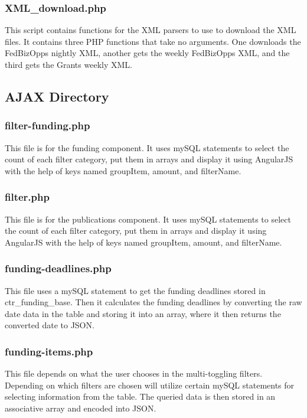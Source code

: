 \documentclass[onecolumn]{IEEEtran}
\begin{document}
\subsubsection{XML\_download.php}
This script contains functions for the XML parsers to use to download the XML files. It contains three PHP functions that take no arguments. One downloads the FedBizOpps nightly XML, another gets the weekly FedBizOpps XML, and the third gets the Grants weekly XML. 
 
\subsection{AJAX Directory}
\subsubsection{filter-funding.php}
This file is for the funding component. It uses mySQL statements to select the count of each filter category, put them in arrays and display it using AngularJS with the help of keys named groupItem, amount, and filterName. 

\subsubsection{filter.php}
This file is for the publications component. It uses mySQL statements to select the count of each filter category, put them in arrays and display it using AngularJS with the help of keys named groupItem, amount, and filterName. 

\subsubsection{funding-deadlines.php}
This file uses a mySQL statement to get the funding deadlines stored in ctr\_funding\_base. Then it calculates the funding deadlines by converting the raw date data in the table and storing it into an array, where it then returns the converted date to JSON. 

\subsubsection{funding-items.php}
This file depends on what the user chooses in the multi-toggling filters. Depending on which filters are chosen will utilize certain mySQL statements for selecting information from the table. The queried data is then stored in an associative array and encoded into JSON.  
\end{document}
